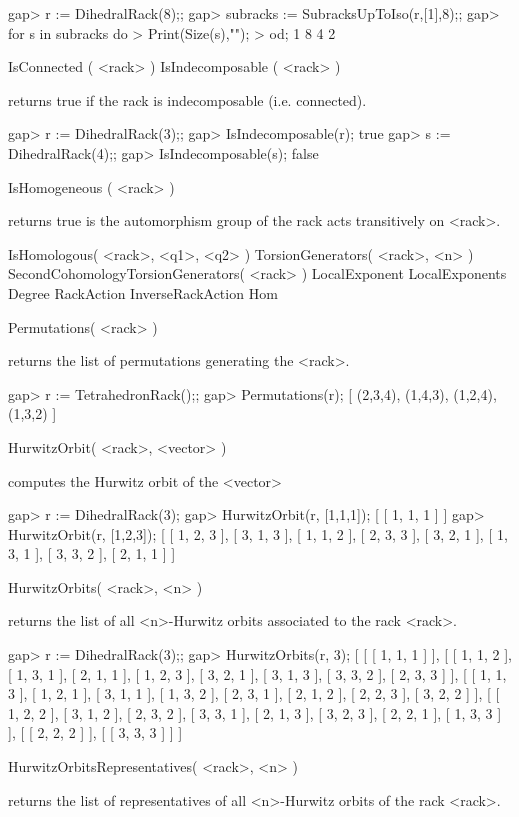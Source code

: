 \beginexample
gap> r := DihedralRack(8);;
gap> subracks := SubracksUpToIso(r,[1],8);;
gap> for s in subracks do
> Print(Size(s),"\n");
> od;
1
8
4
2
\endexample

\>IsConnected ( <rack> )
\>IsIndecomposable ( <rack> )

returns true if the rack is indecomposable (i.e. connected).

\beginexample
gap> r := DihedralRack(3);;
gap> IsIndecomposable(r);
true
gap> s := DihedralRack(4);;
gap> IsIndecomposable(s);
false
\endexample

\>IsHomogeneous ( <rack> )

returns true is the automorphism group of the rack acts transitively on <rack>.

\>IsHomologous( <rack>, <q1>, <q2> )
\>TorsionGenerators( <rack>, <n> )
\>SecondCohomologyTorsionGenerators( <rack> )
\>LocalExponent
\>LocalExponents
\>Degree
\>RackAction
\>InverseRackAction
\>Hom

\>Permutations( <rack> )

returns the list of permutations generating the <rack>.

\beginexample
gap> r := TetrahedronRack();;
gap> Permutations(r);
[ (2,3,4), (1,4,3), (1,2,4), (1,3,2) ]
\endexample

\>HurwitzOrbit( <rack>, <vector> )

computes the Hurwitz orbit of the <vector>

\beginexample
gap> r := DihedralRack(3);   
gap> HurwitzOrbit(r, [1,1,1]); 
[ [ 1, 1, 1 ] ]
gap> HurwitzOrbit(r, [1,2,3]);
[ [ 1, 2, 3 ], [ 3, 1, 3 ], [ 1, 1, 2 ], [ 2, 3, 3 ], [ 3, 2, 1 ], [ 1, 3, 1 ], [ 3, 3, 2 ], [ 2, 1, 1 ] ]
\endexample 

\>HurwitzOrbits( <rack>, <n> )

returns the list of all <n>-Hurwitz orbits associated to the rack <rack>.

\beginexample
gap> r := DihedralRack(3);;
gap> HurwitzOrbits(r, 3);
[ [ [ 1, 1, 1 ] ], [ [ 1, 1, 2 ], [ 1, 3, 1 ], [ 2, 1, 1 ], [ 1, 2, 3 ], [ 3, 2, 1 ], [ 3, 1, 3 ], [ 3, 3, 2 ], 
      [ 2, 3, 3 ] ], [ [ 1, 1, 3 ], [ 1, 2, 1 ], [ 3, 1, 1 ], [ 1, 3, 2 ], [ 2, 3, 1 ], [ 2, 1, 2 ], [ 2, 2, 3 ], 
      [ 3, 2, 2 ] ], [ [ 1, 2, 2 ], [ 3, 1, 2 ], [ 2, 3, 2 ], [ 3, 3, 1 ], [ 2, 1, 3 ], [ 3, 2, 3 ], [ 2, 2, 1 ], 
      [ 1, 3, 3 ] ], [ [ 2, 2, 2 ] ], [ [ 3, 3, 3 ] ] ]
\endexample

\>HurwitzOrbitsRepresentatives( <rack>, <n> )

returns the list of representatives of all <n>-Hurwitz orbits of the rack <rack>.

